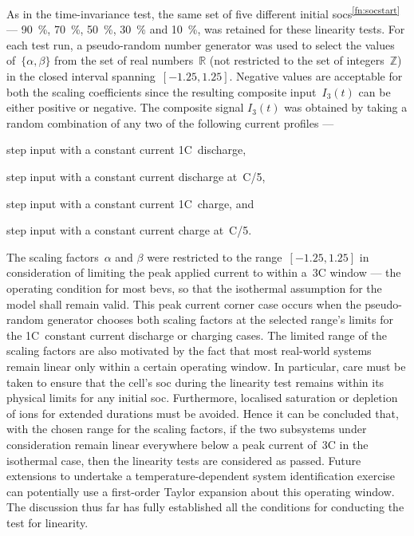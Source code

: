 As   in   the  time-invariance   test,   the   same   set  of   five   different
initial  \glspl{soc}\textsuperscript{\ref{fn:socstart}}  ---  \SI{90}{\percent},
\SI{70}{\percent},  \SI{50}{\percent}, \SI{30}{\percent}  and \SI{10}{\percent},
was  retained for  these linearity  tests. For  each test  run, a  pseudo-random
number generator  was used to select  the values of~$\{\alpha,\beta\}$  from the
set  of  real numbers~$\mathbb{R}$  (not  restricted  to  the set  of  integers~$\mathbb{Z}$) in  the closed  interval spanning~$[-1.25,1.25]$.  Negative values
are acceptable for  both the scaling coefficients since  the resulting composite
input~$I_3(t)$ can be either positive or negative. The composite signal $I_3(t)$
was obtained by taking a random combination  of any two of the following current
profiles ---
\begin{enumerate*}[label=\emph{\alph*})]
    \item step input with a constant current 1C~discharge,
    \item step input with a constant current discharge at~C/5,
    \item step input with a constant current 1C~charge, and
    \item step input with a constant current charge at~C/5.
\end{enumerate*}

The   scaling   factors~$\alpha$   and    $\beta$   were   restricted   to   the
range~$[-1.25,1.25]$ in  consideration of limiting  the peak applied  current to
within a~\pm 3C window --- the operating condition for most \glspl{bev}, so that
the isothermal  assumption for the model  shall remain valid. This  peak current
corner case occurs when the pseudo-random generator chooses both scaling factors
at the selected range's limits for the 1C~constant current discharge or charging
cases. The limited range  of the scaling factors are also  motivated by the fact
that  most real-world  systems remain  linear  only within  a certain  operating
window. In  particular, care must be  taken to ensure that  the cell's \gls{soc}
during the  linearity test remains  within its  physical limits for  any initial
\gls{soc}. Furthermore, localised  saturation or depletion of  ions for extended
durations must be avoided. Hence it can be concluded that, with the chosen range
for the scaling factors, if the two subsystems under consideration remain linear
everywhere  below a  peak current  of~\pm 3C  in the  isothermal case,  then the
linearity  tests are  considered as  passed.  Future extensions  to undertake  a
temperature-dependent  system  identification  exercise can  potentially  use  a
first-order Taylor  expansion about this  operating window. The  discussion thus
far  has fully  established  all  the conditions  for  conducting  the test  for
linearity.


